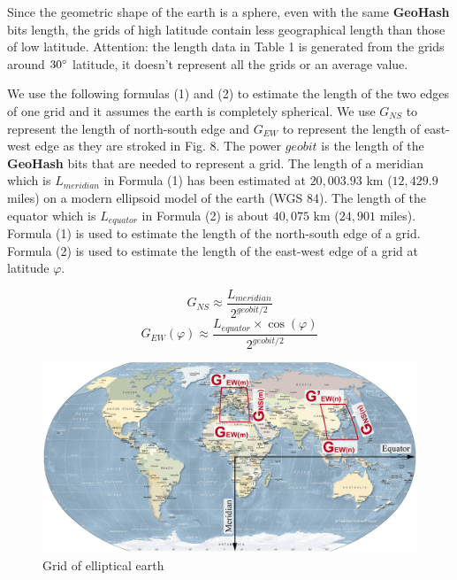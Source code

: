 \documentclass[conference]{IEEEtran}
\begin{document}
Since the geometric shape of the earth is a sphere, even with the same \textbf{GeoHash} bits length, the grids of high latitude contain less geographical length than those of low latitude.
Attention: the length data in Table 1 is generated from the grids around $30\degree$ latitude, it doesn't represent all the grids or an average value.

We use the following formulas (1) and (2) to estimate the length of the two edges of one grid and it assumes the earth is completely spherical.
We use $G_{NS}$ to represent the length of north-south edge and $G_{EW}$ to represent the length of east-west edge as they are stroked in Fig. 8.
The power $geobit$ is the length of the \textbf{GeoHash} bits that are needed to represent a grid.
The length of a meridian which is $L_{meridian}$ in Formula (1) has been estimated at $20,003.93$ km ($12,429.9$ miles) on a modern ellipsoid model of the earth (WGS 84)\cite{weintrit2013so}.
The length of the equator which is $L_{equator}$ in Formula (2) is about $40,075$ km ($24,901$ miles)\cite{equator2011}.
Formula (1) is used to estimate the length of the north-south edge of a grid.
Formula (2) is used to estimate the length of the east-west edge of a grid at latitude $\varphi$.

\begin{equation}
    G_{NS}\approx\frac{L_{meridian}}{2^{geobit/2}}
\end{equation}
\begin{equation}
    G_{EW}(\varphi)\approx\frac{L_{equator}\times\cos(\varphi)}{2^{geobit/2}}
\end{equation}

\begin{figure}[h]
    \centering\includegraphics[width=\linewidth]{earth.png}
    \caption{Grid of elliptical earth}
\end{figure}
\end{document}
